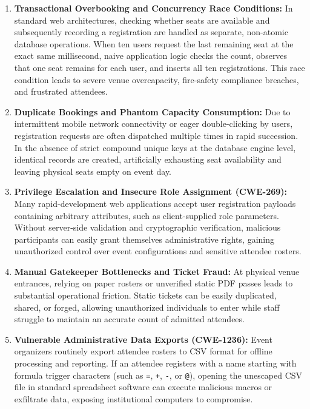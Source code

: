 \documentclass[11pt,a4paper]{report}
\begin{document}
\begin{enumerate}[leftmargin=1.5em, itemsep=0.8em]
    \item \textbf{Transactional Overbooking and Concurrency Race Conditions:} In standard web architectures, checking whether seats are available and subsequently recording a registration are handled as separate, non-atomic database operations. When ten users request the last remaining seat at the exact same millisecond, naive application logic checks the count, observes that one seat remains for each user, and inserts all ten registrations. This race condition leads to severe venue overcapacity, fire-safety compliance breaches, and frustrated attendees.
    \item \textbf{Duplicate Bookings and Phantom Capacity Consumption:} Due to intermittent mobile network connectivity or eager double-clicking by users, registration requests are often dispatched multiple times in rapid succession. In the absence of strict compound unique keys at the database engine level, identical records are created, artificially exhausting seat availability and leaving physical seats empty on event day.
    \item \textbf{Privilege Escalation and Insecure Role Assignment (CWE-269):} Many rapid-development web applications accept user registration payloads containing arbitrary attributes, such as client-supplied role parameters. Without server-side validation and cryptographic verification, malicious participants can easily grant themselves administrative rights, gaining unauthorized control over event configurations and sensitive attendee rosters.
    \item \textbf{Manual Gatekeeper Bottlenecks and Ticket Fraud:} At physical venue entrances, relying on paper rosters or unverified static PDF passes leads to substantial operational friction. Static tickets can be easily duplicated, shared, or forged, allowing unauthorized individuals to enter while staff struggle to maintain an accurate count of admitted attendees.
    \item \textbf{Vulnerable Administrative Data Exports (CWE-1236):} Event organizers routinely export attendee rosters to CSV format for offline processing and reporting. If an attendee registers with a name starting with formula trigger characters (such as \texttt{=}, \texttt{+}, \texttt{-}, or \texttt{@}), opening the unescaped CSV file in standard spreadsheet software can execute malicious macros or exfiltrate data, exposing institutional computers to compromise.
\end{enumerate}
\end{document}
